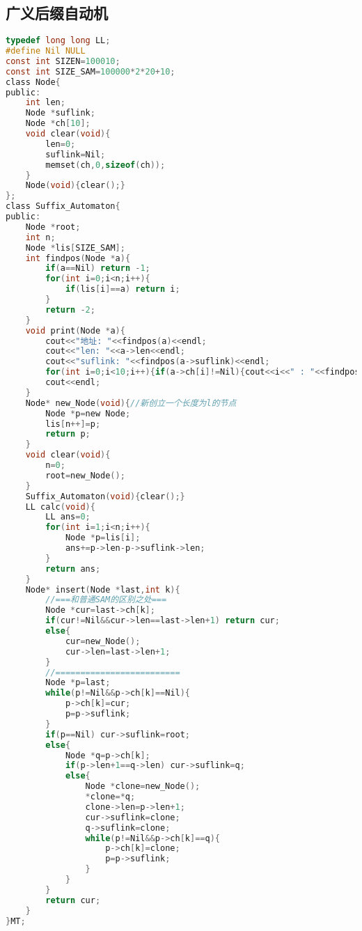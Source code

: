 \subsection{广义后缀自动机}
\begin{lstlisting}[language=C]
typedef long long LL;
#define Nil NULL
const int SIZEN=100010;
const int SIZE_SAM=100000*2*20+10;
class Node{
public:
	int len;
	Node *suflink;
	Node *ch[10];
	void clear(void){
		len=0;
		suflink=Nil;
		memset(ch,0,sizeof(ch));
	}
	Node(void){clear();}
};
class Suffix_Automaton{
public:
	Node *root;
	int n;
	Node *lis[SIZE_SAM];
	int findpos(Node *a){
		if(a==Nil) return -1;
		for(int i=0;i<n;i++){
			if(lis[i]==a) return i;
		}
		return -2;
	}
	void print(Node *a){
		cout<<"地址: "<<findpos(a)<<endl;
		cout<<"len: "<<a->len<<endl;
		cout<<"suflink: "<<findpos(a->suflink)<<endl;
		for(int i=0;i<10;i++){if(a->ch[i]!=Nil){cout<<i<<" : "<<findpos(a->ch[i])<<endl;}}
		cout<<endl;
	}
	Node* new_Node(void){//新创立一个长度为l的节点
		Node *p=new Node;
		lis[n++]=p;
		return p;
	}
	void clear(void){
		n=0;
		root=new_Node();
	}
	Suffix_Automaton(void){clear();}
	LL calc(void){
		LL ans=0;
		for(int i=1;i<n;i++){
			Node *p=lis[i];
			ans+=p->len-p->suflink->len;
		}
		return ans;
	}
	Node* insert(Node *last,int k){
		//===和普通SAM的区别之处===
		Node *cur=last->ch[k];
		if(cur!=Nil&&cur->len==last->len+1) return cur;
		else{
			cur=new_Node();
			cur->len=last->len+1;
		}
		//=========================
		Node *p=last;
		while(p!=Nil&&p->ch[k]==Nil){
			p->ch[k]=cur;
			p=p->suflink;
		}
		if(p==Nil) cur->suflink=root;
		else{
			Node *q=p->ch[k];
			if(p->len+1==q->len) cur->suflink=q;
			else{
				Node *clone=new_Node();
				*clone=*q;
				clone->len=p->len+1;
				cur->suflink=clone;
				q->suflink=clone;
				while(p!=Nil&&p->ch[k]==q){
					p->ch[k]=clone;
					p=p->suflink;
				}
			}
		}
		return cur;
	}
}MT;
\end{lstlisting}
